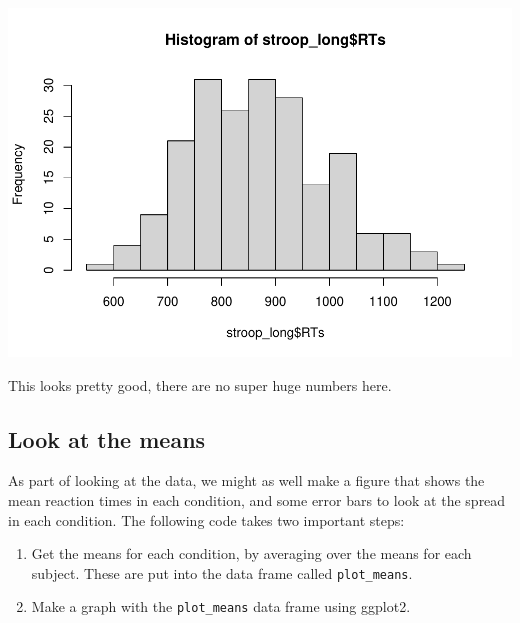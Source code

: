 \documentclass[
]{book}
\begin{document}
\includegraphics{Statistics_Lab_files/figure-latex/unnamed-chunk-555-1.pdf}

This looks pretty good, there are no super huge numbers here.

\hypertarget{look-at-the-means-1}{%
\subsection{Look at the means}\label{look-at-the-means-1}}

As part of looking at the data, we might as well make a figure that shows the mean reaction times in each condition, and some error bars to look at the spread in each condition. The following code takes two important steps:

\begin{enumerate}
\def\labelenumi{\arabic{enumi}.}
\item
  Get the means for each condition, by averaging over the means for each subject. These are put into the data frame called \texttt{plot\_means}.
\item
  Make a graph with the \texttt{plot\_means} data frame using ggplot2.
\end{enumerate}
\end{document}
